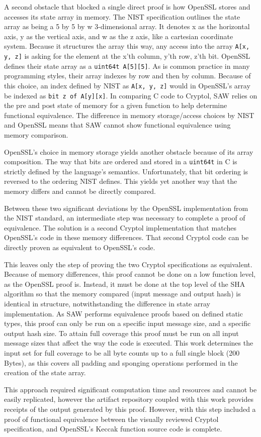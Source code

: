 A second obstacle that blocked a single direct proof is how OpenSSL stores and accesses its state array in memory.  
The NIST specification outlines the state array as being a 5 by 5 by w 3-dimensional array.
It denotes x as the horizontal axis, y as the vertical axis, and w as the z axis, like a cartesian coordinate system.
Because it structures the array this way, any access into the array \texttt{A[x, y, z]} is asking for the element at the x'th column, y'th row, z'th bit.
OpenSSL defines their state array as a \texttt{uint64\textunderscore t A[5][5]}.
As is common practice in many programming styles, their array indexes by row and then by column.
Because of this choice, an index defined by NIST as \texttt{A[x, y, z]} would in OpenSSL's array be indexed as \texttt{bit z of A[y][x]}.
In comparing C code to Cryptol, SAW relies on the pre and post state of memory for a given function to help determine functional equivalence.
The difference in memory storage/access choices by NIST and OpenSSL means that SAW cannot show functional equivalence using memory comparison.

OpenSSL's choice in memory storage yields another obstacle because of its array composition.
The way that bits are ordered and stored in a \texttt{uint64\textunderscore t} in C is strictly defined by the language's semantics.
Unfortunately, that bit ordering is reversed to the ordering NIST defines.
This yields yet another way that the memory differs and cannot be directly compared.

Between these two significant deviations by the OpenSSL implementation from the NIST standard, an intermediate step was necessary to complete a proof of equivalence.
The solution is a second Cryptol implementation that matches OpenSSL's code in these memory differences.
That second Cryptol code can be directly proven as equivalent to OpenSSL's code.

This leaves only the step of proving the two Cryptol specifications as equivalent.
Because of memory differences, this proof cannot be done on a low function level, as the OpenSSL proof is.
Instead, it must be done at the top level of the SHA algorithm so that the memory compared (input message and output hash) is identical in structure, notwithstanding the difference in state array implementation.
As SAW performs equivalence proofs based on defined static types, this proof can only be run on a specific input message size, and a specific output hash size.
To attain full coverage this proof must be run on all input message sizes that affect the way the code is executed.
This work determines the input set for full coverage to be all byte counts up to a full single block (200 Bytes), as this covers all padding and sponging operations performed in the creation of the state array.

This approach required significant computation time and resources and cannot be easily replicated, however the artifact repository coupled with this work provides receipts of the output generated by this proof.
However, with this step included a proof of functional equivalence between the visually reviewed Cryptol specification, and OpenSSL's Keccak function source code is complete.